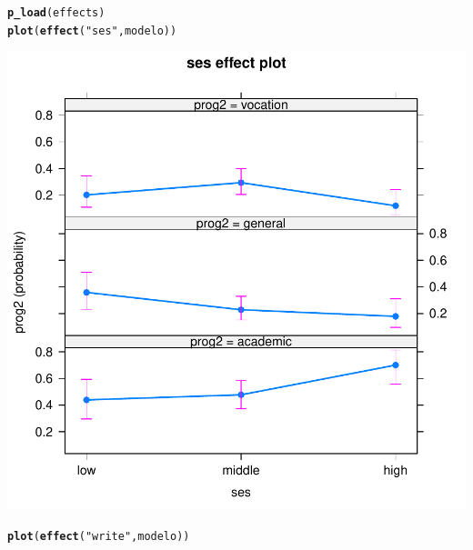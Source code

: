 \documentclass[onesided]{article}\usepackage[]{graphicx}\usepackage[]{color}
\makeatletter
\def\maxwidth{ %
  \ifdim\Gin@nat@width>\linewidth
    \linewidth
  \else
    \Gin@nat@width
  \fi
}
\newcommand{\hlstr}[1]{\textcolor[rgb]{0.192,0.494,0.8}{#1}}%
\newcommand{\hlstd}[1]{\textcolor[rgb]{0.345,0.345,0.345}{#1}}%
\newcommand{\hlkwd}[1]{\textcolor[rgb]{0.737,0.353,0.396}{\textbf{#1}}}%
\newenvironment{kframe}{%
 \def\at@end@of@kframe{}%
 \ifinner\ifhmode%
  \def\at@end@of@kframe{\end{minipage}}%
  \begin{minipage}{\columnwidth}%
 \fi\fi%
 \def\FrameCommand##1{\hskip\@totalleftmargin \hskip-\fboxsep
 \colorbox{shadecolor}{##1}\hskip-\fboxsep
     \hskip-\linewidth \hskip-\@totalleftmargin \hskip\columnwidth}%
 \MakeFramed {\advance\hsize-\width
   \@totalleftmargin\z@ \linewidth\hsize
   \@setminipage}}%
 {\par\unskip\endMakeFramed%
 \at@end@of@kframe}
\makeatother
\begin{document}
\begin{kframe}
\begin{alltt}
\hlkwd{p_load}\hlstd{(effects)}
\hlkwd{plot}\hlstd{(}\hlkwd{effect}\hlstd{(}\hlstr{"ses"}\hlstd{, modelo))}
\end{alltt}
\end{kframe}

{\centering \includegraphics[width=\maxwidth]{figure/pp-1} 

}


\begin{kframe}\begin{alltt}
\hlkwd{plot}\hlstd{(}\hlkwd{effect}\hlstd{(}\hlstr{"write"}\hlstd{, modelo))}
\end{alltt}
\end{kframe}
\end{document}
